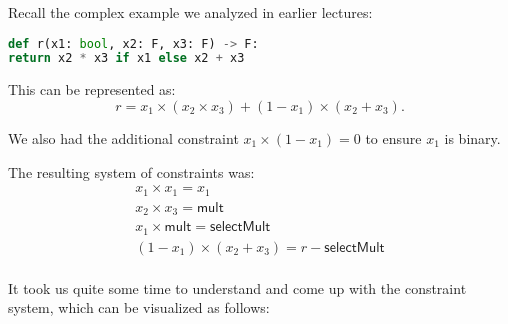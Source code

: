 \documentclass[../lecture-notes-148x210.tex]{subfiles}
\begin{document}
\begin{example}
    Recall the complex example we analyzed in earlier lectures:

    \begin{lstlisting}[language=Python,numbers=none]
def r(x1: bool, x2: F, x3: F) -> F:
return x2 * x3 if x1 else x2 + x3
    \end{lstlisting}

    This can be represented as:
    \[
        r = x_1 \times (x_2 \times x_3) + (1 - x_1) \times (x_2 + x_3).
    \]

    We also had the additional constraint $x_1 \times (1 - x_1) = 0$ to ensure $x_1$ is binary.

    The resulting system of constraints was:
    \begin{gather*}
        x_1 \times x_1 = x_1 \tag{1}\\
        x_2 \times x_3 = \mathsf{mult} \tag{2}\\
        x_1 \times \mathsf{mult} = \mathsf{selectMult} \tag{3}\\
        (1 - x_1) \times (x_2 + x_3) = r - \mathsf{selectMult} \tag{4}\\
    \end{gather*}
\end{example}

It took us quite some time to understand and come up with the constraint system, which can be visualized as follows:
\end{document}
